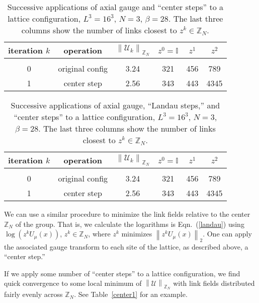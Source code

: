 \documentclass[preprint,aps,prd]{revtex4-2}
\newcommand{\zentrum}{{\mathbb{Z}_N}}       %
\newcommand{\config}{\mathcal{U}}
\begin{document}
\begin{table}
  \caption{Successive applications of axial gauge
    and ``center steps'' to
    a lattice configuration, $L^3=16^3$, $N=3$, $\beta=28$.
    The last three columns show the number of links closest
    to $z^k \in \zentrum$.
    \label{center2}}
  \begin{tabular}{cccccc}
    iteration $k$ & operation & $\left\lVert \config_k \right\rVert_\zentrum$
     & $z^0=\mathbb{I}$ & $z^1$ & $z^2$ \\
    \hline\\
    0 & original config & 3.24 & 321 & 456 & 789\\
    1 & center step     & 2.56 & 343 & 443 & 4345 \\
  \end{tabular}
  \end{table}

\begin{table}
  \caption{Successive applications of axial gauge,
    ``Landau steps,'' and ``center steps'' to
    a lattice configuration, $L^3=16^3$, $N=3$, $\beta=28$.
    The last three columns show the number of links closest
    to $z^k \in \zentrum$.
    \label{center3}}
  \begin{tabular}{cccccc}
    iteration $k$ & operation & $\left\lVert \config_k \right\rVert_\zentrum$
     & $z^0=\mathbb{I}$ & $z^1$ & $z^2$ \\
    \hline\\
    0 & original config & 3.24 & 321 & 456 & 789\\
    1 & center step     & 2.56 & 343 & 443 & 4345 \\
  \end{tabular}
  \end{table}

We can use a similar procedure to minimize the link fields
relative to the center $\zentrum$ of the group.
That is, we calculate the logarithms is Eqn.~(\ref{landau})
using $\log\left( z^k U_\mu(x)\right)$, $z^k\in\zentrum$,
where $z^k$ minimizes $\left\lVert z^k U_\mu(x) \right\rVert_2$.
One can apply the associated gauge transform to each site of
the lattice, as described above, a ``center step.''

If we apply some number of ``center steps'' to a lattice
configuration, we find quick convergence to some local
minimum of $\left\lVert \config \right\rVert_\zentrum$ with
link fields distributed fairly evenly across $\zentrum$.
See Table~\ref{center1} for an example.
\end{document}
